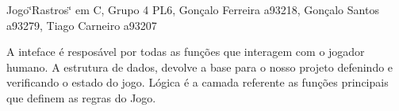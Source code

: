 Jogo\char`\"{}\+Rastros\char`\"{} em C, Grupo 4 P\+L6, Gonçalo Ferreira a93218, Gonçalo Santos a93279, Tiago Carneiro a93207

A inteface é resposável por todas as funções que interagem com o jogador humano. A estrutura de dados, devolve a base para o nosso projeto defenindo e verificando o estado do jogo. Lógica é a camada referente as funções principais que definem as regras do Jogo. 